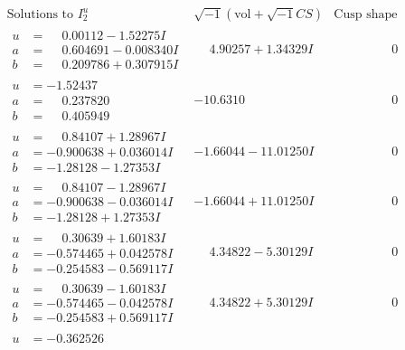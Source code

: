 \documentclass[1p]{elsarticle_modified}
\theoremstyle{definition}
\newcommand{\I}{\sqrt{-1}}
\begin{document}
$$\begin{array}{c|c|c}
\text{Solutions to }I^u_{2}& \I (\text{vol} + \sqrt{-1}CS) & \text{Cusp shape}\\
 \hline 
\begin{aligned}
u &= \phantom{-}0.00112 - 1.52275 I \\
a &= \phantom{-}0.604691 - 0.008340 I \\
b &= \phantom{-}0.209786 + 0.307915 I\end{aligned}
 & \phantom{-}4.90257 + 1.34329 I & \phantom{-0.000000 } 0 \\ \hline\begin{aligned}
u &= -1.52437\phantom{ +0.000000I} \\
a &= \phantom{-}0.237820\phantom{ +0.000000I} \\
b &= \phantom{-}0.405949\phantom{ +0.000000I}\end{aligned}
 & -10.6310\phantom{ +0.000000I} & \phantom{-0.000000 } 0 \\ \hline\begin{aligned}
u &= \phantom{-}0.84107 + 1.28967 I \\
a &= -0.900638 + 0.036014 I \\
b &= -1.28128 - 1.27353 I\end{aligned}
 & -1.66044 - 11.01250 I & \phantom{-0.000000 } 0 \\ \hline\begin{aligned}
u &= \phantom{-}0.84107 - 1.28967 I \\
a &= -0.900638 - 0.036014 I \\
b &= -1.28128 + 1.27353 I\end{aligned}
 & -1.66044 + 11.01250 I & \phantom{-0.000000 } 0 \\ \hline\begin{aligned}
u &= \phantom{-}0.30639 + 1.60183 I \\
a &= -0.574465 + 0.042578 I \\
b &= -0.254583 - 0.569117 I\end{aligned}
 & \phantom{-}4.34822 - 5.30129 I & \phantom{-0.000000 } 0 \\ \hline\begin{aligned}
u &= \phantom{-}0.30639 - 1.60183 I \\
a &= -0.574465 - 0.042578 I \\
b &= -0.254583 + 0.569117 I\end{aligned}
 & \phantom{-}4.34822 + 5.30129 I & \phantom{-0.000000 } 0 \\ \hline\begin{aligned}
u &= -0.362526\phantom{ +0.000000I} \\

\end{aligned}
\end{array}$$
\end{document}
